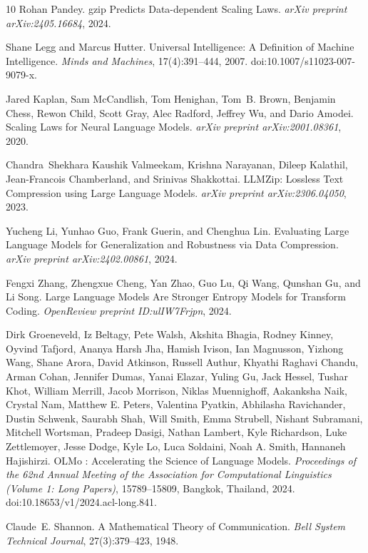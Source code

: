 \documentclass[11pt]{article}
\begin{document}
\begin{thebibliography}{10}
Rohan Pandey.
\newblock gzip Predicts Data-dependent Scaling Laws.
\newblock \emph{arXiv preprint arXiv:2405.16684}, 2024.

Shane Legg and Marcus Hutter.
\newblock Universal Intelligence: A Definition of Machine Intelligence.
\newblock \emph{Minds and Machines}, 17(4):391--444, 2007.
\newblock doi:10.1007/s11023-007-9079-x.

Jared Kaplan, Sam McCandlish, Tom Henighan, Tom~B. Brown, Benjamin Chess, Rewon Child, Scott Gray, Alec Radford, Jeffrey Wu, and Dario Amodei.
\newblock Scaling Laws for Neural Language Models.
\newblock \emph{arXiv preprint arXiv:2001.08361}, 2020.

Chandra~Shekhara Kaushik Valmeekam, Krishna Narayanan, Dileep Kalathil, Jean-Francois Chamberland, and Srinivas Shakkottai.
\newblock LLMZip: Lossless Text Compression using Large Language Models.
\newblock \emph{arXiv preprint arXiv:2306.04050}, 2023.

Yucheng Li, Yunhao Guo, Frank Guerin, and Chenghua Lin.
\newblock Evaluating Large Language Models for Generalization and Robustness via Data Compression.
\newblock \emph{arXiv preprint arXiv:2402.00861}, 2024.

Fengxi Zhang, Zhengxue Cheng, Yan Zhao, Guo Lu, Qi Wang, Qunshan Gu, and Li Song.
\newblock Large Language Models Are Stronger Entropy Models for Transform Coding.
\newblock \emph{OpenReview preprint ID:ulIW7Frjpn}, 2024.

Dirk Groeneveld, Iz Beltagy, Pete Walsh, Akshita Bhagia, Rodney Kinney, Oyvind Tafjord, Ananya Harsh Jha, Hamish Ivison, Ian Magnusson, Yizhong Wang, Shane Arora, David Atkinson, Russell Authur, Khyathi Raghavi Chandu, Arman Cohan, Jennifer Dumas, Yanai Elazar, Yuling Gu, Jack Hessel, Tushar Khot, William Merrill, Jacob Morrison, Niklas Muennighoff, Aakanksha Naik, Crystal Nam, Matthew E. Peters, Valentina Pyatkin, Abhilasha Ravichander, Dustin Schwenk, Saurabh Shah, Will Smith, Emma Strubell, Nishant Subramani, Mitchell Wortsman, Pradeep Dasigi, Nathan Lambert, Kyle Richardson, Luke Zettlemoyer, Jesse Dodge, Kyle Lo, Luca Soldaini, Noah A. Smith, Hannaneh Hajishirzi.
\newblock OLMo : Accelerating the Science of Language Models.
\newblock \emph{Proceedings of the 62nd Annual Meeting of the Association for Computational Linguistics (Volume 1: Long Papers)}, 15789–15809, Bangkok, Thailand, 2024. doi:10.18653/v1/2024.acl-long.841.

Claude~E. Shannon.
\newblock A Mathematical Theory of Communication.
\newblock \emph{Bell System Technical Journal}, 27(3):379--423, 1948.

\end{thebibliography}
\end{document}
